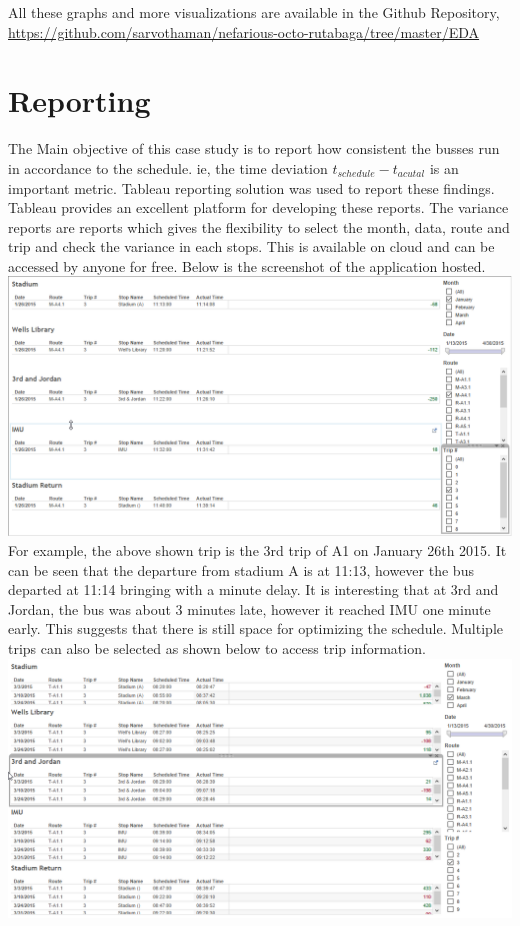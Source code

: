 \documentclass[12pt]{article}\usepackage[]{graphicx}\usepackage[]{color}
\begin{document}
All these graphs and more visualizations are available in the Github Repository, \url{https://github.com/sarvothaman/nefarious-octo-rutabaga/tree/master/EDA}
\section{Reporting}
The Main objective of this case study is to report how consistent the busses run in accordance to the schedule. ie, the time deviation $t_{schedule}-t_{acutal}$ is an important metric. Tableau reporting solution was used to report these findings. \\

Tableau provides an excellent platform for developing these reports. The variance reports are reports which gives the flexibility to select the month, data, route and trip and check the variance in each stops. This is available on cloud and can be accessed by anyone for free. Below is the screenshot of the application hosted.\\
\includegraphics[scale=0.4]{resources/tableau4}\\[1cm] 
For example, the above shown trip is the 3rd trip of A1 on January 26th 2015. It can be seen that the departure from stadium A is at 11:13, however the bus departed at 11:14 bringing with a minute delay. It is interesting that at 3rd and Jordan, the bus was about 3 minutes late, however it reached IMU one minute early. This suggests that there is still space for optimizing the schedule. Multiple trips can also be selected as shown below to access trip information.
\includegraphics[scale=0.4]{resources/tableau5}\\[1cm] 
\end{document}
